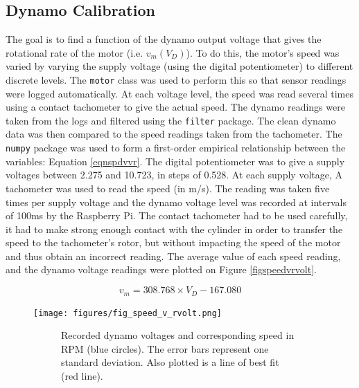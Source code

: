 \documentclass[twoside,a4]{report}
\def\br{\newline \newline \noindent}
\begin{document}
	\subsection*{Dynamo Calibration}
	The goal is to find a function of the dynamo output voltage that gives the rotational rate of the motor (i.e. \(v_m ({V_D})\)). To do this, the motor's speed was varied by varying the supply voltage (using the digital potentiometer) to different discrete levels. The \texttt{motor} class was used to perform this so that sensor readings were logged automatically. At each voltage level, the speed was read several times using a contact tachometer to give the actual speed. The dynamo readings were taken from the logs and filtered using the \texttt{filter} package. The clean dynamo data was then compared to the speed readings taken from the tachometer. The \texttt{numpy} package was used to form a first-order empirical relationship between the variables: Equation \ref{eqnspdvvr}. 
	\br
	The digital potentiometer was to give a supply voltages between 2.275 and 10.723, in steps of 0.528. At each supply voltage, A tachometer was used to read the speed (in m/s). The reading was taken five times per supply voltage and the dynamo voltage level was recorded at intervals of 100ms by the Raspberry Pi. The contact tachometer had to be used carefully, it had to make strong enough contact with the cylinder in order to transfer the speed to the tachometer's rotor, but without impacting the speed of the motor and thus obtain an incorrect reading. The average value of each speed reading, and the dynamo voltage readings were plotted on Figure \ref{figspeedvrvolt}.
	
	\begin{equation}
	v_m = 308.768 \times {V_D} - 167.080
	\label{eqnspdvvr}
	\end{equation}
	
	
	\begin{figure}[!htb]
		\centering
		\texttt{[image: figures/fig\_speed\_v\_rvolt.png]}
		\caption{Dynamo Calibration Results}
		\label{figspeedvrvolt}
		\begin{subfigure}{0.9\textwidth}
			\footnotesize Recorded dynamo voltages and corresponding speed in RPM (blue circles). The error bars represent one standard deviation. Also plotted is a line of best fit (red line).
		\end{subfigure}
	\end{figure}
	
\end{document}
